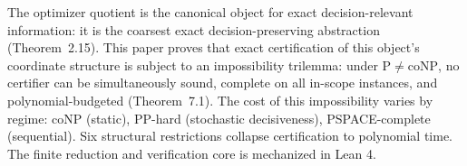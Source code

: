 The optimizer quotient is the canonical object for exact decision-relevant information: it is the coarsest exact decision-preserving abstraction (Theorem~2.15). This paper proves that exact certification of this object's coordinate structure is subject to an impossibility trilemma: under $\mathrm{P} \neq \mathrm{coNP}$, no certifier can be simultaneously sound, complete on all in-scope instances, and polynomial-budgeted (Theorem~7.1). The cost of this impossibility varies by regime: coNP (static), PP-hard (stochastic decisiveness), PSPACE-complete (sequential). Six structural restrictions collapse certification to polynomial time. The finite reduction and verification core is mechanized in Lean 4.
